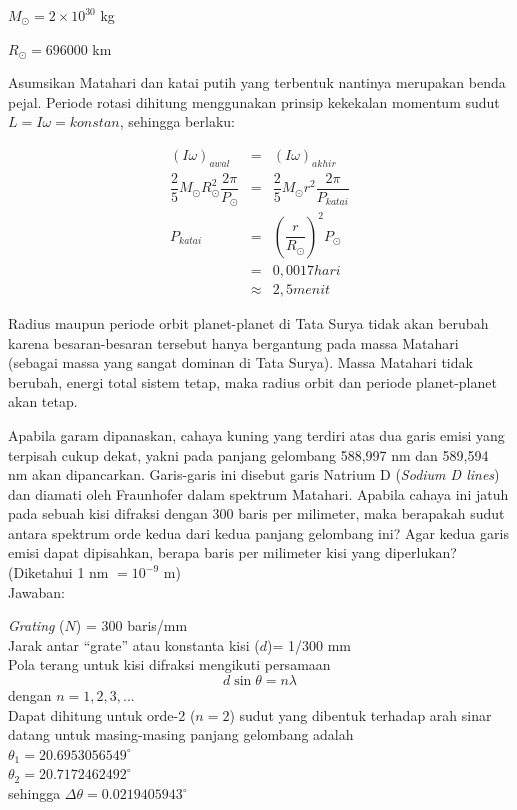 \documentclass[11pt,fleqn]{exam}
\begin{document}
\begin{questions}
\begin{choices}
$M_{\odot}=2\times10^{30} $ kg

$R_{\odot}=696000 $ km

Asumsikan Matahari dan katai putih yang terbentuk nantinya merupakan benda pejal. Periode rotasi dihitung menggunakan prinsip kekekalan momentum sudut $L=I\omega=konstan$, sehingga berlaku:

\begin{eqnarray*}
(I\omega)_{awal}&=&(I\omega)_{akhir}\\
\dfrac{2}{5}M_{\odot}R_{\odot}^2\dfrac{2\pi}{P_{\odot}}&=&\dfrac{2}{5}M_{\odot}r^2\dfrac{2\pi}{P_{katai}}\\
P_{katai}&=&(\dfrac{r}{R_{\odot}})^2P_{\odot}\\
&=& 0,0017 hari\\
&\approx& 2,5 menit
\end{eqnarray*}

\choice Radius maupun periode orbit planet-planet di Tata Surya tidak akan berubah karena besaran-besaran tersebut hanya bergantung pada massa Matahari (sebagai massa yang sangat dominan di Tata Surya). Massa Matahari tidak berubah, energi total sistem tetap, maka radius orbit dan periode planet-planet akan tetap.\\
\end{choices}


\question Apabila garam dipanaskan, cahaya kuning yang terdiri atas dua garis emisi yang terpisah cukup dekat, yakni pada panjang gelombang 588,997 nm dan 589,594 nm akan dipancarkan. Garis-garis ini disebut garis Natrium D (\textit{Sodium D lines}) dan diamati oleh Fraunhofer dalam spektrum Matahari. Apabila cahaya ini jatuh pada sebuah kisi difraksi dengan 300 baris per milimeter, maka berapakah sudut antara spektrum orde kedua dari kedua panjang gelombang ini? Agar kedua garis emisi dapat dipisahkan, berapa baris per milimeter kisi yang diperlukan? (Diketahui 1 nm $= 10^{-9}$ m)\\

Jawaban:

\textit{Grating} ($N$) = 300 baris/mm\\
Jarak antar ``grate'' atau konstanta kisi ($d$)= 1/300 mm\\
Pola terang untuk kisi difraksi mengikuti persamaan 
\begin{equation*}
d \sin \theta = n \lambda 
\end{equation*}
dengan $n = 1, 2, 3, ...$\\

Dapat dihitung untuk orde-2 ($n=2$) sudut yang dibentuk terhadap arah sinar datang untuk masing-masing panjang gelombang adalah\\
$\theta_1 = 20.6953056549^{\circ}$\\
$\theta_2 = 20.7172462492^{\circ}$\\
sehingga $\Delta \theta = 0.0219405943^{\circ}$
 

\end{questions}
\end{document}
